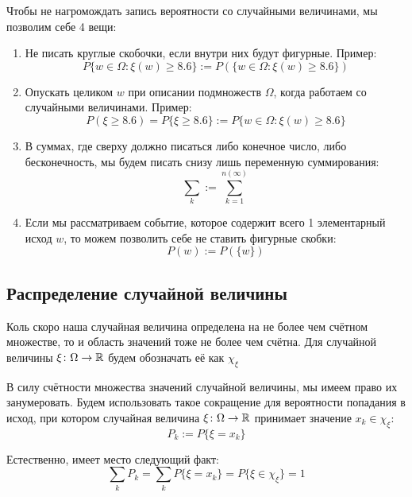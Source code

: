 \begin{agreement}
	Чтобы не нагромождать запись вероятности со случайными величинами, мы позволим себе 4 вещи:
	\begin{enumerate}
		\item Не писать круглые скобочки, если внутри них будут фигурные. Пример:
		\[
			P\{w \in \Omega \colon \xi(w) \ge 8.6\} := P(\{w \in \Omega \colon \xi(w) \ge 8.6\})
		\]
		
		\item Опускать целиком $w$ при описании подмножеств $\Omega$, когда работаем со случайными величинами. Пример:
		\[
			P(\xi \ge 8.6) = P\{\xi \ge 8.6\} := P\{w \in \Omega \colon \xi(w) \ge 8.6\}
		\]
		
		\item В суммах, где сверху должно писаться либо конечное число, либо бесконечность, мы будем писать снизу лишь переменную суммирования:
		\[
			\sum_k := \sum_{k = 1}^{n(\infty)}
		\]
		
		\item Если мы рассматриваем событие, которое содержит всего 1 элементарный исход $w$, то можем позволить себе не ставить фигурные скобки:
		\[
			P(w) := P(\{w\})
		\]
	\end{enumerate}
\end{agreement}

\subsection{Распределение случайной величины}

\begin{designation}
	Коль скоро наша случайная величина определена на не более чем счётном множестве, то и область значений тоже не более чем счётна. Для случайной величины $\xi \colon \Omega \to \mathbb{R}$ будем обозначать её как $\chi_\xi$
\end{designation}

\begin{designation}
	В силу счётности множества значений случайной величины, мы имеем право их занумеровать. Будем использовать такое сокращение для вероятности попадания в исход, при котором случайная величина $\xi \colon \Omega \to \mathbb{R}$ принимает значение $x_k \in \chi_\xi$:
	\[
		P_k := P\{\xi = x_k\}
	\]
\end{designation}

\begin{note}
	Естественно, имеет место следующий факт:
	\[
		\sum_k P_k = \sum_k P\{\xi = x_k\} = P\{\xi \in \chi_\xi\} = 1
	\]
\end{note}